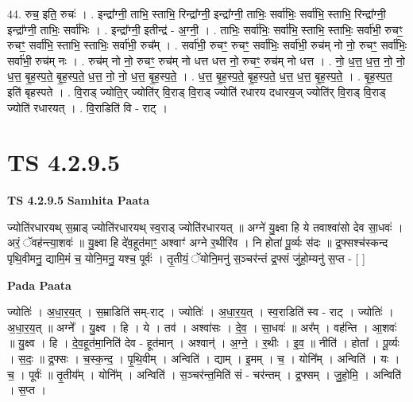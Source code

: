 \documentclass[17pt]{extarticle}
\begin{document}
44. रुच॒ इति॒ रुचः॑ । . इन्द्रा᳚ग्नी॒ ताभि॒ स्ताभि॒ रिन्द्रा᳚ग्नी॒ इन्द्रा᳚ग्नी॒ ताभिः॒ सर्वा॑भिः॒ सर्वा॑भि॒ स्ताभि॒ रिन्द्रा᳚ग्नी॒ इन्द्रा᳚ग्नी॒ ताभिः॒ सर्वा॑भिः । . इन्द्रा᳚ग्नी॒ इतीन्द्र॑ - अ॒ग्नी॒ । . ताभिः॒ सर्वा॑भिः॒ सर्वा॑भि॒ स्ताभि॒ स्ताभिः॒ सर्वा॑भी॒ रुचꣳ॒॒ रुचꣳ॒॒ सर्वा॑भि॒ स्ताभि॒ स्ताभिः॒ सर्वा॑भी॒ रुच᳚म् । . सर्वा॑भी॒ रुचꣳ॒॒ रुचꣳ॒॒ सर्वा॑भिः॒ सर्वा॑भी॒ रुच॑म् नो नो॒ रुचꣳ॒॒ सर्वा॑भिः॒ सर्वा॑भी॒ रुच॑म् नः । . रुच॑म् नो नो॒ रुचꣳ॒॒ रुच॑म् नो धत्त धत्त नो॒ रुचꣳ॒॒ रुच॑म् नो धत्त । . नो॒ ध॒त्त॒ ध॒त्त॒ नो॒ नो॒ ध॒त्त॒ बृ॒ह॒स्प॒ते॒ बृ॒ह॒स्प॒ते॒ ध॒त्त॒ नो॒ नो॒ ध॒त्त॒ बृ॒ह॒स्प॒ते॒ । . ध॒त्त॒ बृ॒ह॒स्प॒ते॒ बृ॒ह॒स्प॒ते॒ ध॒त्त॒ ध॒त्त॒ बृ॒ह॒स्प॒ते॒ । . बृ॒ह॒स्प॒त॒ इति॑ बृहस्पते । . वि॒राड् ज्योति॒र् ज्योति॑र् वि॒राड् वि॒राड् ज्योति॑ रधारय दधारय॒ज् ज्योति॑र् वि॒राड् वि॒राड् ज्योति॑ रधारयत् । . वि॒राडिति॑ वि - राट् । \newline
\pagebreak
{}

\section{ TS 4.2.9.5 }

\textbf{TS 4.2.9.5 } \newline
\textbf{Samhita Paata} \newline

ज्योति॑रधारयथ् स॒म्राड् ज्योति॑रधारयथ् स्व॒राड् ज्योति॑रधारयत् ॥ अग्ने॑ यु॒क्ष्वा हि ये तवाश्वा॑सो देव सा॒धवः॑ । अरं॒ ॅवह॑न्त्या॒शवः॑ ॥ यु॒क्ष्वा हि दे॑व॒हूत॑माꣳ॒॒ अश्वाꣳ॑ अग्ने र॒थीरि॑व । नि होता॑ पू॒र्व्यः स॑दः ॥ द्र॒फ्सश्च॑स्कन्द पृथि॒वीमनु॒ द्यामि॒मं च॒ योनि॒मनु॒ यश्च॒ पूर्वः॑ । तृ॒तीयं॒ ॅयोनि॒मनु॑ स॒ञ्चर॑न्तं द्र॒फ्सं जु॑हो॒म्यनु॑ स॒प्त - [  ] \newline

\textbf{Pada Paata} \newline

ज्योतिः॑ । अ॒धा॒र॒य॒त् । स॒म्राडिति॑ सम्-राट् । ज्योतिः॑ । अ॒धा॒र॒य॒त् । स्व॒राडिति॑ स्व - राट् । ज्योतिः॑ । अ॒धा॒र॒य॒त् ॥ अग्ने᳚ । यु॒क्ष्व । हि । ये । तव॑ । अश्वा॑सः । दे॒व॒ । सा॒धवः॑ ॥ अर᳚म् । वह॑न्ति । आ॒शवः॑ ॥ यु॒क्ष्व । हि । दे॒व॒हूत॑मा॒निति॑ देव - हूत॑मान् । अश्वान्॑ । अ॒ग्ने॒ । र॒थीः । इ॒व॒ ॥ नीति॑ । होता᳚ । पू॒र्व्यः । स॒दः॒ ॥ द्र॒फ्सः । च॒स्क॒न्द॒ । पृ॒थि॒वीम् । अन्विति॑ । द्याम् । इ॒मम् । च॒ । योनि᳚म् । अन्विति॑ । यः । च॒ । पूर्वः॑ ॥ तृ॒तीय᳚म् । योनि᳚म् । अन्विति॑ । स॒ञ्चर॑न्त॒मिति॑ सं - चर॑न्तम् । द्र॒फ्सम् । जु॒हो॒मि॒ । अन्विति॑ । स॒प्त ।  \newline
\end{document}
